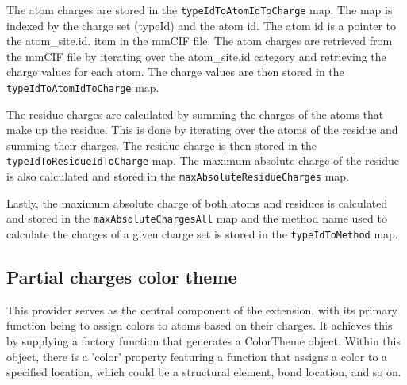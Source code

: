 \documentclass[
  digital,     %
  oneside,     %
  nosansbold,  %
  nocolorbold, %
  lof,         %
  lot,         %
]{fithesis4}
\begin{document}

The atom charges are stored in the \texttt{typeIdToAtomIdToCharge} map. The map is indexed by the charge set (typeId) and the atom id. The atom id is a pointer to the atom\_site.id. item in the mmCIF file. The atom charges are retrieved from the mmCIF file by iterating over the atom\_site.id category and retrieving the charge values for each atom. The charge values are then stored in the \\ \texttt{typeIdToAtomIdToCharge} map.

The residue charges are calculated by summing the charges of the atoms that make up the residue. This is done by iterating over the atoms of the residue and summing their charges. The residue charge is then stored in the \texttt{typeIdToResidueIdToCharge} map. The maximum absolute charge of the residue is also calculated and stored in the \texttt{maxAbsoluteResidueCharges} map.

Lastly, the maximum absolute charge of both atoms and residues is calculated and stored in the \texttt{maxAbsoluteChargesAll} map and the method name used to calculate the charges of a given charge set is stored in the \texttt{typeIdToMethod} map.

\subsection{Partial charges color theme}

This provider serves as the central component of the extension, with its primary function being to assign colors to atoms based on their charges. It achieves this by supplying a factory function that generates a ColorTheme object. Within this object, there is a 'color' property featuring a function that assigns a color to a specified location, which could be a structural element, bond location, and so on.
\end{document}
